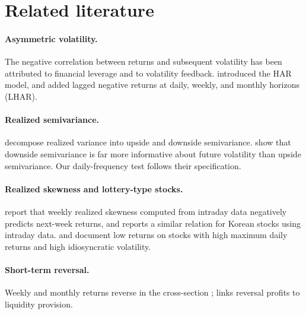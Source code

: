 \documentclass[11pt]{article}
\begin{document}
\section{Related literature}

\paragraph{Asymmetric volatility.} The negative correlation between returns and subsequent volatility has been attributed to financial leverage \citep{black1976,christie1982} and to volatility feedback. \citet{corsi2009} introduced the HAR model, and \citet{corsireno2012} added lagged negative returns at daily, weekly, and monthly horizons (LHAR).

\paragraph{Realized semivariance.} \citet{bns2010} decompose realized variance into upside and downside semivariance. \citet{pattonsheppard2015} show that downside semivariance is far more informative about future volatility than upside semivariance. Our daily-frequency test follows their specification.

\paragraph{Realized skewness and lottery-type stocks.} \citet{amaya2015} report that weekly realized skewness computed from intraday data negatively predicts next-week returns, and \citet{sim2016} reports a similar relation for Korean stocks using intraday data. \citet{bali2011} and \citet{ang2006} document low returns on stocks with high maximum daily returns and high idiosyncratic volatility.

\paragraph{Short-term reversal.} Weekly and monthly returns reverse in the cross-section \citep{jegadeesh1990,lehmann1990}; \citet{nagel2012} links reversal profits to liquidity provision.
\end{document}
